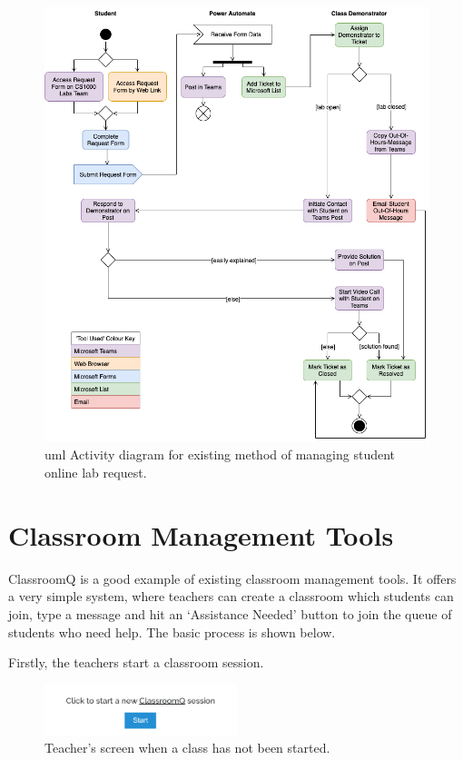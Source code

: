 \FloatBarrier
\begin{figure}[H]
  \centering
  \includegraphics[width=\textwidth]{2context/images/activityRevised.png}
  \caption{\gls{uml} Activity diagram for existing method of managing student online lab request.}
\end{figure}

\newpage
\section{Classroom Management Tools}

ClassroomQ is a good example of existing classroom management tools. It offers a very simple system, where teachers can create a classroom which students can join, type a message and hit an `Assistance Needed' button to join the queue of students who need help. The basic process is shown below.

Firstly, the teachers start a classroom session.

\FloatBarrier
\begin{figure}[H]
  \centering
  \includegraphics[width=0.5\textwidth]{2context/images/cq1.png}
  \caption{Teacher's screen when a class has not been started.}
\end{figure}

